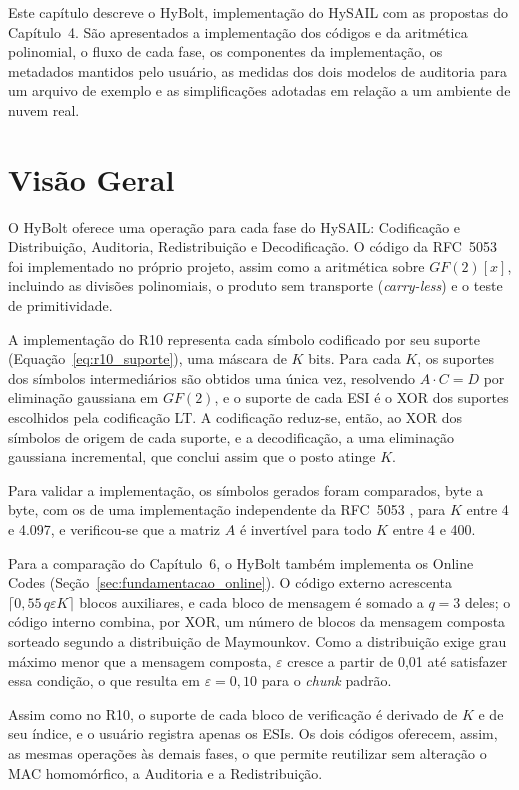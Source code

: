Este capítulo descreve o HyBolt, implementação do HySAIL com as propostas do Capítulo~4. São apresentados a implementação dos códigos e da aritmética polinomial, o fluxo de cada fase, os componentes da implementação, os metadados mantidos pelo usuário, as medidas dos dois modelos de auditoria para um arquivo de exemplo e as simplificações adotadas em relação a um ambiente de nuvem real.

\section{Visão Geral}

O HyBolt oferece uma operação para cada fase do HySAIL: Codificação e Distribuição, Auditoria, Redistribuição e Decodificação. O código da RFC~5053 \cite{luby2007rfc5053} foi implementado no próprio projeto, assim como a aritmética sobre $GF(2)[x]$, incluindo as divisões polinomiais, o produto sem transporte (\emph{carry-less}) e o teste de primitividade.

A implementação do R10 representa cada símbolo codificado por seu suporte (Equação~\eqref{eq:r10_suporte}), uma máscara de $K$ bits. Para cada $K$, os suportes dos símbolos intermediários são obtidos uma única vez, resolvendo $A \cdot C = D$ por eliminação gaussiana em $GF(2)$, e o suporte de cada \acrshort{ESI} é o XOR dos suportes escolhidos pela codificação LT. A codificação reduz-se, então, ao XOR dos símbolos de origem de cada suporte, e a decodificação, a uma eliminação gaussiana incremental, que conclui assim que o posto atinge $K$.

Para validar a implementação, os símbolos gerados foram comparados, byte a byte, com os de uma implementação independente da RFC~5053 \cite{gofountain}, para $K$ entre 4 e 4.097, e verificou-se que a matriz $A$ é invertível para todo $K$ entre 4 e 400.

Para a comparação do Capítulo~6, o HyBolt também implementa os Online Codes \cite{maymounkov2002online} (Seção~\ref{sec:fundamentacao_online}). O código externo acrescenta $\lceil 0{,}55\, q \varepsilon K \rceil$ blocos auxiliares, e cada bloco de mensagem é somado a $q = 3$ deles; o código interno combina, por XOR, um número de blocos da mensagem composta sorteado segundo a distribuição de Maymounkov. Como a distribuição exige grau máximo menor que a mensagem composta, $\varepsilon$ cresce a partir de 0,01 até satisfazer essa condição, o que resulta em $\varepsilon = 0{,}10$ para o \emph{chunk} padrão.

Assim como no R10, o suporte de cada bloco de verificação é derivado de $K$ e de seu índice, e o usuário registra apenas os \acrshort{ESI}s. Os dois códigos oferecem, assim, as mesmas operações às demais fases, o que permite reutilizar sem alteração o \acrshort{MAC} homomórfico, a Auditoria e a Redistribuição.

